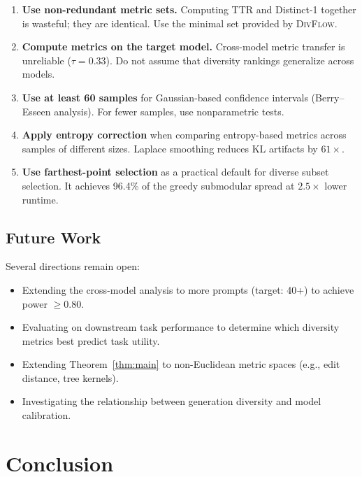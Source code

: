 \documentclass[11pt,a4paper]{article}
\newcommand{\divflow}{\textsc{DivFlow}}
\begin{document}
\begin{enumerate}[leftmargin=2em,itemsep=2pt]
\item \textbf{Use non-redundant metric sets.}
      Computing TTR and Distinct-1 together is wasteful;
      they are identical.  Use the minimal set provided
      by \divflow{}.
\item \textbf{Compute metrics on the target model.}
      Cross-model metric transfer is unreliable
      ($\tau = 0.33$).  Do not assume that diversity
      rankings generalize across models.
\item \textbf{Use at least 60 samples} for Gaussian-based
      confidence intervals (Berry--Esseen analysis).
      For fewer samples, use nonparametric tests.
\item \textbf{Apply entropy correction} when comparing
      entropy-based metrics across samples of different
      sizes.  Laplace smoothing reduces KL artifacts by
      $61\times$.
\item \textbf{Use farthest-point selection} as a
      practical default for diverse subset selection.
      It achieves 96.4\% of the greedy submodular
      spread at $2.5\times$ lower runtime.
\end{enumerate}

\subsection{Future Work}

Several directions remain open:
\begin{itemize}[leftmargin=2em,itemsep=2pt]
\item Extending the cross-model analysis to more prompts
      (target: 40+) to achieve power $\geq 0.80$.
\item Evaluating on downstream task performance to
      determine which diversity metrics best predict
      task utility.
\item Extending Theorem~\ref{thm:main} to non-Euclidean
      metric spaces (e.g., edit distance, tree kernels).
\item Investigating the relationship between generation
      diversity and model calibration.
\end{itemize}

\section{Conclusion}\label{sec:conclusion}
\end{document}
